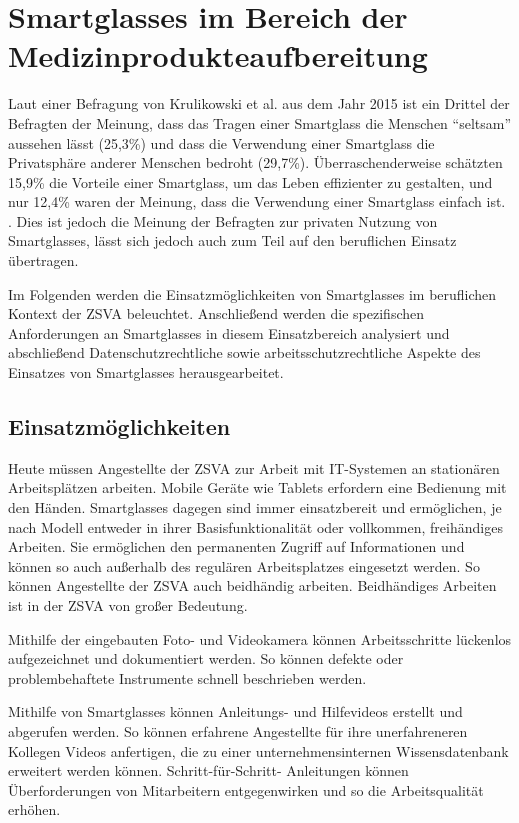 \section{Smartglasses im Bereich der Medizinprodukteaufbereitung}
\label{sec:Smartglasses_im_Bereich_der_Medizinprodukteaufbereitung}
Laut einer Befragung von Krulikowski et al. aus dem Jahr 2015 \cite{Hein2016} ist ein Drittel der Befragten der Meinung, dass das Tragen einer Smartglass die Menschen \enquote{seltsam} aussehen lässt (25,3\%) und dass die Verwendung einer Smartglass die Privatsphäre anderer Menschen bedroht (29,7\%). Überraschenderweise schätzten 15,9\% die Vorteile einer Smartglass, um das Leben effizienter zu gestalten, und nur 12,4\% waren der Meinung, dass die Verwendung einer Smartglass einfach ist. \cite{Hein2016}. Dies ist jedoch die Meinung der Befragten zur privaten Nutzung von Smartglasses, lässt sich jedoch auch zum Teil auf den beruflichen Einsatz übertragen.

Im Folgenden werden die Einsatzmöglichkeiten von Smartglasses im beruflichen Kontext der ZSVA beleuchtet. Anschließend werden die spezifischen Anforderungen an Smartglasses in diesem Einsatzbereich analysiert und abschließend Datenschutzrechtliche sowie arbeitsschutzrechtliche Aspekte des Einsatzes von Smartglasses herausgearbeitet.
%
%
%
%
%
%
\subsection{Einsatzmöglichkeiten}
\label{sec:Einsatzmoeglichkeiten}
Heute müssen Angestellte der ZSVA zur Arbeit mit IT-Systemen an stationären Arbeitsplätzen arbeiten. Mobile Geräte wie Tablets erfordern eine Bedienung mit den Händen. Smartglasses dagegen sind immer einsatzbereit und ermöglichen, je nach Modell entweder in ihrer Basisfunktionalität oder vollkommen, freihändiges Arbeiten. Sie ermöglichen den permanenten Zugriff auf Informationen und können so auch außerhalb des regulären Arbeitsplatzes eingesetzt werden. So können Angestellte der ZSVA auch beidhändig arbeiten. Beidhändiges Arbeiten ist in der ZSVA von großer Bedeutung.

Mithilfe der eingebauten Foto- und Videokamera können Arbeitsschritte lückenlos aufgezeichnet und dokumentiert werden. So können defekte oder problembehaftete Instrumente schnell beschrieben werden.

Mithilfe von Smartglasses können Anleitungs- und Hilfevideos erstellt und abgerufen werden. So können erfahrene Angestellte für ihre unerfahreneren Kollegen Videos anfertigen, die zu einer unternehmensinternen Wissensdatenbank erweitert werden können. Schritt-für-Schritt- Anleitungen können Überforderungen von Mitarbeitern entgegenwirken und so die Arbeitsqualität erhöhen. 

